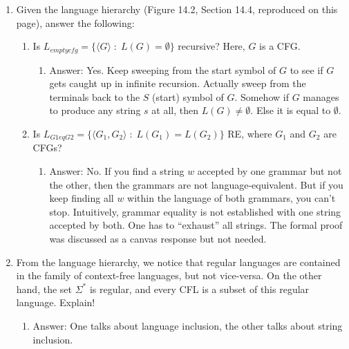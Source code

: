 \documentclass[10pt]{article}
\begin{document}
\begin{enumerate}
\item Given the language hierarchy (Figure 14.2, Section 14.4,
  reproduced on this page),
  answer the following:
  \begin{enumerate}
  \item Is \( L_{emptycfg} =
    \{ \langle G\rangle \;:\; L(G)=\emptyset \}\) recursive? Here,
    $G$ is a CFG.

    \begin{enumerate}
    \item[] {\sf Answer: Yes. Keep sweeping from the start symbol of $G$
      to see if $G$ gets caught up in infinite recursion. Actually sweep
      from the terminals back to the $S$ (start) symbol of $G$. Somehow
      if $G$ manages to produce any string $s$ at all, then $L(G)\neq\emptyset$.
      Else it is equal to $\emptyset$.
      }
    \end{enumerate}

  \item Is \( L_{G1eqG2} =
    \{ \langle G_1,G_2\rangle \;:\; L(G_1)= L(G_2) \}\) RE, where
    $G_1$ and $G_2$
    are CFGs?

    \begin{enumerate}
    \item[] {\sf Answer: No.
      If you find a string $w$ accepted by one grammar but not the other, then
      the grammars are not language-equivalent.
      But if you keep finding all $w$ within the language of both grammars, you can't stop.
      Intuitively, grammar equality is not established with one string accepted by both.
      One has to ``exhaust'' all strings.
      The formal proof was discussed as a canvas response but not needed.
      }
    \end{enumerate}    
    
  \end{enumerate}
  
\item From the language hierarchy,
  we notice that  regular languages are contained
  in the family of context-free languages,
  but not vice-versa. On the other hand,
    the set $\Sigma^*$ is
    regular,
    and every CFL is a subset of this regular language.
    Explain!
    \begin{enumerate}
    \item[] {\sf Answer: One talks about language inclusion, the other
      talks about string inclusion.}
    \end{enumerate}
    

\end{enumerate}
\end{document}
